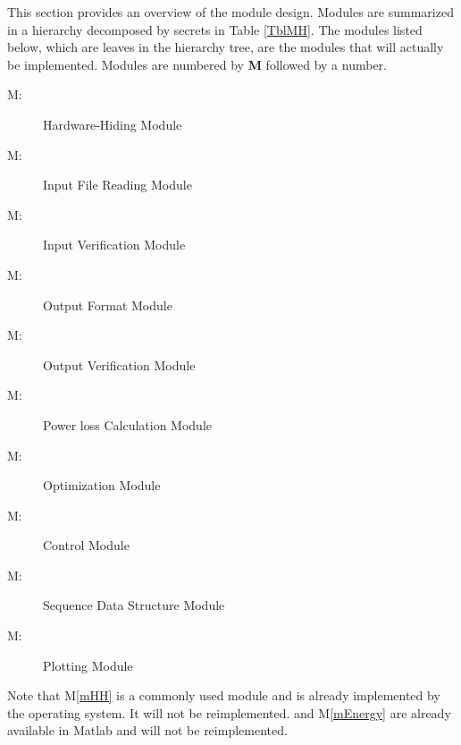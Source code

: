 \documentclass[12pt]{article}
\newcounter{mnum}
\newcommand{\mthemnum}{M\themnum}
\newcommand{\mref}[1]{M\ref{#1}}
\begin{document}
This section provides an overview of the module design. Modules are summarized
in a hierarchy decomposed by secrets in Table \ref{TblMH}. The modules listed
below, which are leaves in the hierarchy tree, are the modules that will
actually be implemented. Modules are numbered by \textbf{M}
followed by a number. 

\begin{description}
\item [ \mthemnum \label{mHH}:] Hardware-Hiding Module
\item [ \mthemnum \label{mParams}:] Input File Reading Module
\item [ \mthemnum \label{mVerify}:] Input Verification Module
\item [ \mthemnum \label{mOutput}:] Output Format Module
\item [ \mthemnum \label{mVerifyOut}:] Output Verification Module
\item [ \mthemnum \label{mODEs}:] Power loss Calculation Module
\item [ \mthemnum \label{mEnergy}:]  Optimization Module
\item [ \mthemnum \label{mControl}:] Control Module
\item [ \mthemnum \label{mSeqDS}:] Sequence Data Structure Module
\item [ \mthemnum \label{mPlot}:] Plotting Module
\end{description}

Note that \mref{mHH} is a commonly used module and is already implemented by the operating
system.  It will not be reimplemented.  and \mref{mEnergy} are already available in Matlab and will not be reimplemented.
\end{document}
